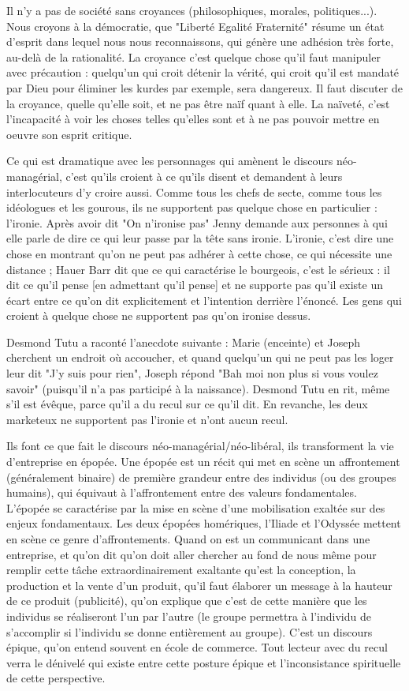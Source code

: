 \documentclass[a4paper,12pt]{book}
\begin{document}
\par Il n'y a pas de société sans croyances (philosophiques, morales, politiques...). Nous croyons à la démocratie, que "Liberté Egalité Fraternité" résume un état d'esprit dans lequel nous nous reconnaissons, qui génère une adhésion très forte, au-delà de la rationalité. La croyance c'est quelque chose qu'il faut manipuler avec précaution : quelqu'un qui croit détenir la vérité, qui croit qu'il est mandaté par Dieu pour éliminer les kurdes par exemple, sera dangereux. Il faut discuter de la croyance, quelle qu'elle soit, et ne pas être naïf quant à elle. La naïveté, c'est l'incapacité à voir les choses telles qu'elles sont et à ne pas pouvoir mettre en oeuvre son esprit critique.
\par Ce qui est dramatique avec les personnages qui amènent le discours néo-managérial, c'est qu'ils croient à ce qu'ils disent et demandent à leurs interlocuteurs d'y croire aussi. Comme tous les chefs de secte, comme tous les idéologues et les gourous, ils ne supportent pas quelque chose en particulier : l'ironie. Après avoir dit "On n'ironise pas" Jenny demande aux personnes à qui elle parle de dire ce qui leur passe par la tête sans ironie. L'ironie, c'est dire une chose en montrant qu'on ne peut pas adhérer à cette chose, ce qui nécessite une distance ; Hauer Barr dit que ce qui caractérise le bourgeois, c'est le sérieux : il dit ce qu'il pense [en admettant qu'il pense] et ne supporte pas qu'il existe un écart entre ce qu'on dit explicitement et l'intention derrière l'énoncé. Les gens qui croient à quelque chose ne supportent pas qu'on ironise dessus.
\par Desmond Tutu a raconté l'anecdote suivante : Marie (enceinte) et Joseph cherchent un endroit où accoucher, et quand quelqu'un qui ne peut pas les loger leur dit "J'y suis pour rien", Joseph répond "Bah moi non plus si vous voulez savoir" (puisqu'il n'a pas participé à la naissance). Desmond Tutu en rit, même s'il est évêque, parce qu'il a du recul sur ce qu'il dit. En revanche, les deux marketeux ne supportent pas l'ironie et n'ont aucun recul.
\par Ils font ce que fait le discours néo-managérial/néo-libéral, ils transforment la vie d'entreprise en épopée. Une épopée est un récit qui met en scène un affrontement (généralement binaire) de première grandeur entre des individus (ou des groupes humains), qui équivaut à l'affrontement entre des valeurs fondamentales. L'épopée se caractérise par la mise en scène d'une mobilisation exaltée sur des enjeux fondamentaux. Les deux épopées homériques, l'Iliade et l'Odyssée mettent en scène ce genre d'affrontements. Quand on est un communicant dans une entreprise, et qu'on dit qu'on doit aller chercher au fond de nous même pour remplir cette tâche extraordinairement exaltante qu'est la conception, la production et la vente d'un produit, qu'il faut élaborer un message à la hauteur de ce produit (publicité), qu'on explique que c'est de cette manière que les individus se réaliseront l'un par l'autre (le groupe permettra à l'individu de s'accomplir si l'individu se donne entièrement au groupe). C'est un discours épique, qu'on entend souvent en école de commerce. Tout lecteur avec du recul verra le dénivelé qui existe entre cette posture épique et l'inconsistance spirituelle de cette perspective.
\end{document}
